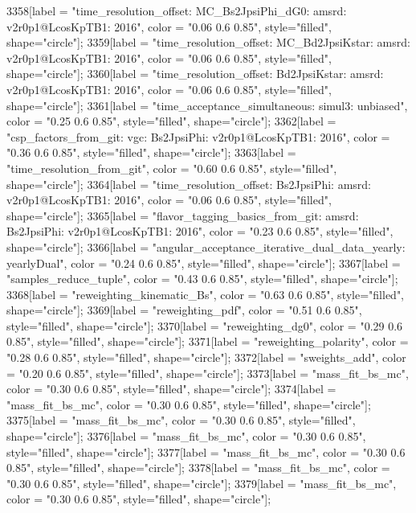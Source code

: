 {	3358[label = "time_resolution_offset\nmode: MC_Bs2JpsiPhi_dG0\ntimeres: amsrd\nversion: v2r0p1@LcosKpTB1\nyear: 2016", color = "0.06 0.6 0.85", style="filled", shape="circle"];
	3359[label = "time_resolution_offset\nmode: MC_Bd2JpsiKstar\ntimeres: amsrd\nversion: v2r0p1@LcosKpTB1\nyear: 2016", color = "0.06 0.6 0.85", style="filled", shape="circle"];
	3360[label = "time_resolution_offset\nmode: Bd2JpsiKstar\ntimeres: amsrd\nversion: v2r0p1@LcosKpTB1\nyear: 2016", color = "0.06 0.6 0.85", style="filled", shape="circle"];
	3361[label = "time_acceptance_simultaneous\ntimeacc: simul3\ntrigger: unbiased", color = "0.25 0.6 0.85", style="filled", shape="circle"];
	3362[label = "csp_factors_from_git\ncsp: vgc\nmode: Bs2JpsiPhi\nversion: v2r0p1@LcosKpTB1\nyear: 2016", color = "0.36 0.6 0.85", style="filled", shape="circle"];
	3363[label = "time_resolution_from_git", color = "0.60 0.6 0.85", style="filled", shape="circle"];
	3364[label = "time_resolution_offset\nmode: Bs2JpsiPhi\ntimeres: amsrd\nversion: v2r0p1@LcosKpTB1\nyear: 2016", color = "0.06 0.6 0.85", style="filled", shape="circle"];
	3365[label = "flavor_tagging_basics_from_git\nflavor: amsrd\nmode: Bs2JpsiPhi\nversion: v2r0p1@LcosKpTB1\nyear: 2016", color = "0.23 0.6 0.85", style="filled", shape="circle"];
	3366[label = "angular_acceptance_iterative_dual_data_yearly\nangacc: yearlyDual", color = "0.24 0.6 0.85", style="filled", shape="circle"];
	3367[label = "samples_reduce_tuple", color = "0.43 0.6 0.85", style="filled", shape="circle"];
	3368[label = "reweighting_kinematic_Bs", color = "0.63 0.6 0.85", style="filled", shape="circle"];
	3369[label = "reweighting_pdf", color = "0.51 0.6 0.85", style="filled", shape="circle"];
	3370[label = "reweighting_dg0", color = "0.29 0.6 0.85", style="filled", shape="circle"];
	3371[label = "reweighting_polarity", color = "0.28 0.6 0.85", style="filled", shape="circle"];
	3372[label = "sweights_add", color = "0.20 0.6 0.85", style="filled", shape="circle"];
	3373[label = "mass_fit_bs_mc", color = "0.30 0.6 0.85", style="filled", shape="circle"];
	3374[label = "mass_fit_bs_mc", color = "0.30 0.6 0.85", style="filled", shape="circle"];
	3375[label = "mass_fit_bs_mc", color = "0.30 0.6 0.85", style="filled", shape="circle"];
	3376[label = "mass_fit_bs_mc", color = "0.30 0.6 0.85", style="filled", shape="circle"];
	3377[label = "mass_fit_bs_mc", color = "0.30 0.6 0.85", style="filled", shape="circle"];
	3378[label = "mass_fit_bs_mc", color = "0.30 0.6 0.85", style="filled", shape="circle"];
	3379[label = "mass_fit_bs_mc", color = "0.30 0.6 0.85", style="filled", shape="circle"];
}
